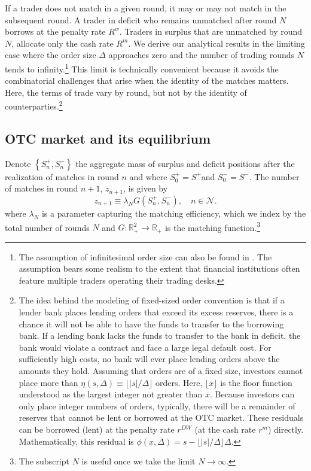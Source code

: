 \documentclass[12pt,american,english,notitlepage]{article}
\begin{document}
If a trader does not match in a given round, it may or may not match
in the subsequent round. A trader in deficit who remains unmatched
after round $N$ borrows at the penalty rate $R^{w}$.
Traders in surplus that are unmatched by round $N$, allocate only
the cash rate $R^{m}.$
We derive our analytical results in the limiting case where the order size $\Delta$ approaches zero and the number of trading rounds $N$ tends to infinity.\footnote{The assumption of infinitesimal order size can also be found in \citet{Shi1997,AEW15}.
The assumption bears some realism to the extent that financial institutions
often feature multiple traders operating their trading desks.} This limit is technically convenient because it avoids the combinatorial
challenges that arise when the identity of the matches matters. Here,
the terms of trade vary by round, but not by the identity of counterparties.\footnote{The idea behind the modeling of fixed-sized order convention is that
if a lender bank places lending orders that exceed its excess reserves,
there is a chance it will not be able to have the funds to transfer
to the borrowing bank. If a lending bank lacks the funds to transfer
to the bank in deficit, the bank would violate a contract and face
a large legal default cost. For sufficiently high costs, no bank
will ever place lending orders above the amounts they hold. Assuming
that orders are of a fixed size, investors cannot place more than
$\eta\left(s,\Delta\right)\equiv\lfloor\left\vert s\right\vert /\Delta\rfloor$
orders. Here, $\lfloor x\rfloor$ is the floor function understood
as the largest integer not greater than $x$. Because investors can
only place integer numbers of orders, typically, there will be a remainder
of reserves that cannot be lent or borrowed at the OTC market. These
residuals can be borrowed (lent) at the penalty
rate $r^{DW}$ (at the cash rate $r^{m}$) directly. Mathematically,
this residual is $\phi\left(x,\Delta\right)=s-\lfloor\left\vert s\right\vert /\Delta\rfloor\Delta$.}

\label{sec:properties}
\subsection{OTC market and its equilibrium}

Denote $\left\{ S_{n}^{+},S_{n}^{-}\right\} $ the aggregate mass
of surplus and deficit positions after the realization of matches
in round $n$ and where $S_{0}^{+}=S^{+}$and $S_{0}^{-}=S^{-}$. The number
of matches in round $n+1$, $z_{n+1}$, is given by
\[
z_{n+1}\equiv\lambda_{N}\ensuremath{G(S_{n}^{+},S_{n}^{-})},\quad n\in\mathcal{N}.
\]
where $\lambda_{N}$ is a parameter capturing the matching efficiency, which we index by the total number of rounds $N$
and $G:\mathbb{R}_{+}^{2}\rightarrow\mathbb{R}_{+}$ is the matching
function.\footnote{The subscript $N$ is useful once we take the limit $N\rightarrow\infty$.}
\end{document}
